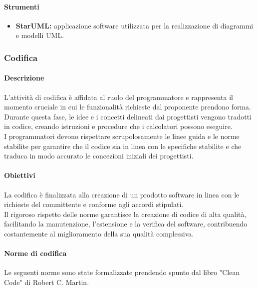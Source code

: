 \paragraph{Strumenti}
\begin{itemize}
    \item \textbf{StarUML:} applicazione software utilizzata per la realizzazione di diagrammi e modelli UML.
\end{itemize}

\subsubsection{Codifica}
\paragraph{Descrizione}
L'attività di codifica è affidata al ruolo del programmatore e rappresenta il momento cruciale in cui le funzionalità richieste dal proponente prendono forma. \\
Durante questa fase, le idee e i concetti delineati dai progettisti vengono tradotti in codice, creando istruzioni e procedure che i calcolatori possono eseguire. \\
I programmatori devono rispettare scrupolosamente le linee guida e le norme stabilite per garantire che il codice sia in linea con le specifiche stabilite e che traduca in modo accurato le concezioni iniziali dei progettisti.
\paragraph{Obiettivi}
La codifica è finalizzata alla creazione di un prodotto software in linea con le richieste del committente e conforme agli accordi stipulati.\\
Il rigoroso rispetto delle norme garantisce la creazione di codice di alta qualità, facilitando la manutenzione, l'estensione e la verifica del software, contribuendo costantemente al miglioramento della sua qualità complessiva.
\paragraph{Norme di codifica}
Le seguenti norme sono state formalizzate prendendo spunto dal libro "Clean Code" di Robert C. Martin.

